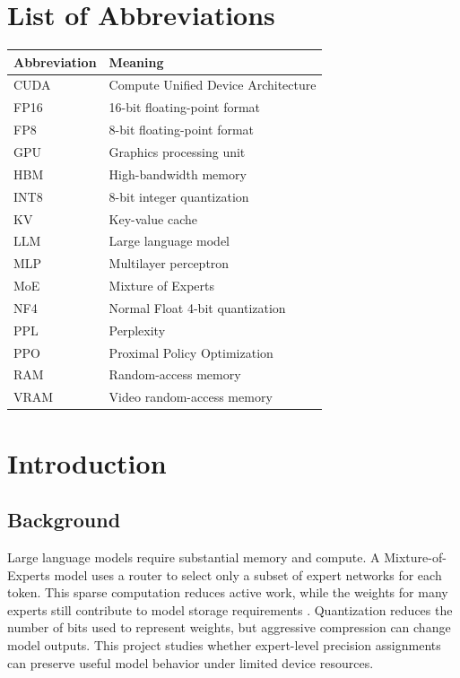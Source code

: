 \documentclass[12pt,a4paper]{report}
\begin{document}
\chapter*{List of Abbreviations}
\begin{tabularx}{\linewidth}{@{}lY@{}}
\toprule
Abbreviation & Meaning\\
\midrule
CUDA & Compute Unified Device Architecture\\
FP16 & 16-bit floating-point format\\
FP8 & 8-bit floating-point format\\
GPU & Graphics processing unit\\
HBM & High-bandwidth memory\\
INT8 & 8-bit integer quantization\\
KV & Key-value cache\\
LLM & Large language model\\
MLP & Multilayer perceptron\\
MoE & Mixture of Experts\\
NF4 & Normal Float 4-bit quantization\\
PPL & Perplexity\\
PPO & Proximal Policy Optimization\\
RAM & Random-access memory\\
VRAM & Video random-access memory\\
\bottomrule
\end{tabularx}
\clearpage


\chapter{Introduction}
\section{Background}
Large language models require substantial memory and compute. A Mixture-of-Experts model uses a router to select only a subset of expert networks for each token. This sparse computation reduces active work, while the weights for many experts still contribute to model storage requirements \citep{muennighoff2024olmoe}. Quantization reduces the number of bits used to represent weights, but aggressive compression can change model outputs. This project studies whether expert-level precision assignments can preserve useful model behavior under limited device resources.
\end{document}
